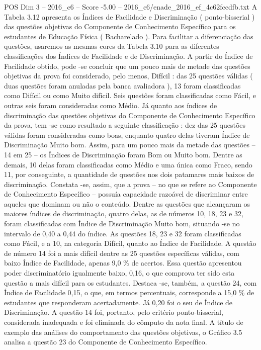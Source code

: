 \begin{textsample}{POS Dim 3 – 2016\_c6 – Score -5.00 – 2016\_c6/enade\_2016\_ef\_4c62fccdfb.txt}
A Tabela 3.12 apresenta os Índices de Facilidade e Discriminação ( ponto-bisserial ) das questões objetivas do Componente de Conhecimento Específico para os estudantes de Educação Física ( Bacharelado ).
Para facilitar a diferenciação das questões, usaremos as mesmas cores da Tabela 3.10 para as diferentes classificações dos Índices de Facilidade e de Discriminação.
A partir do Índice de Facilidade obtido, pode -se concluir que um pouco mais de metade das questões objetivas da prova foi considerado, pelo menos, Difícil : das 25 questões válidas ( duas questões foram anuladas pela banca avaliadora ), 13 foram classificadas como Difícil ou como Muito difícil.
Seis questões foram classificadas como Fácil, e outras seis foram consideradas como Médio.
Já quanto aos índices de discriminação das questões objetivas do Componente de Conhecimento Específico da prova, tem -se como resultado a seguinte classificação : dez das 25 questões válidas foram consideradas como boas, enquanto quatro delas tiveram Índice de Discriminação Muito bom.
Assim, para um pouco mais da metade das questões – 14 em 25 – os Índices de Discriminação foram Bom ou Muito bom.
Dentre as demais, 10 delas foram classificadas como Médio e uma única como Fraco, sendo 11, por conseguinte, a quantidade de questões nos dois patamares mais baixos de discriminação.
Constata -se, assim, que a prova – no que se refere ao Componente de Conhecimento Específico – possuía capacidade razoável de discriminar entre aqueles que dominam ou não o conteúdo.
Dentre as questões que alcançaram os maiores índices de discriminação, quatro delas, as de números 10, 18, 23 e 32, foram classificadas com Índice de Discriminação Muito bom, situando -se no intervalo de 0,40 a 0,44 do índice.
As questões 18, 23 e 32 foram classificadas como Fácil, e a 10, na categoria Difícil, quanto ao Índice de Facilidade.
A questão de número 14 foi a mais difícil dentre as 25 questões específicas válidas, com baixo Índice de Facilidade, apenas 9,0 \% de acertos.
Essa questão apresentou poder discriminatório igualmente baixo, 0,16, o que comprova ter sido esta questão a mais difícil para os estudantes.
Destaca -se, também, a questão 24, com Índice de Facilidade 0,15, o que, em termos percentuais, corresponde a 15,0 \% de estudantes que responderam acertadamente.
Já 0,20 foi o seu de Índice de Discriminação.
A questão 14 foi, portanto, pelo critério ponto-bisserial, considerada inadequada e foi eliminada do cômputo da nota final.
A título de exemplo das análises do comportamento das questões objetivas, o Gráfico 3.5 analisa a questão 23 do Componente de Conhecimento Específico.

\end{textsample}
